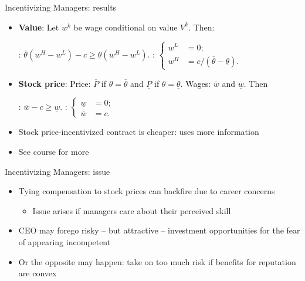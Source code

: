 \documentclass[english,10pt
,aspectratio=169
]{beamer}
\begin{document}
\begin{frame}{Incentivizing Managers: results}
	\begin{itemize}
		\item \textbf{Value}: Let $w^{k}$ be wage conditional on  value $V^{k}$. Then:
		\smallskip
		\begin{center}
			: $ \overline{\theta} (w^{H}-w^L) - c \geq \underline{\theta} (w^{H}-w^L)$. 
			\bigskip
			:
			$ \displaystyle
			\left\{
			\begin{aligned}
			w^{L} 	& = 0; \\
			w^{H}	& = c/(\overline{\theta}-\underline{\theta}).
			\end{aligned}
			\right.
			$
		\end{center}
		\smallskip
		\item \textbf{Stock price}: \textcolor{black}{Price}: $\overline{P}$ if $\theta=\overline{\theta}$ and $\underline{P}$ if $\theta=\underline{\theta}$. \textcolor{black}{Wages}: $\overline{w}$ and $\underline{w}$. Then
		\smallskip 
		\begin{center}
			: $\overline{w}-c \geq \underline{w}$. 
			\bigskip
			:
			$ \displaystyle
			\left\{
			\begin{aligned}
			\underline{w} 	& = 0; \\
			\overline{w}	& = c.
			\end{aligned}
			\right.
			$
		\end{center}
		\smallskip 
		\item Stock price-incentivized contract is cheaper: uses more information
		\item See  course for more
	\end{itemize}
\end{frame}


\begin{frame}{Incentivizing Managers: issue}
	\begin{itemize}
		\item Tying compensation to stock prices can backfire due to \alert{career concerns}
		\begin{itemize}
			\item Issue arises if managers care about their perceived skill
		\end{itemize}
		\item CEO may forego risky -- but attractive -- investment opportunities for the fear of appearing incompetent
		\item Or the opposite may happen: take on too much risk if benefits for reputation are convex
	\end{itemize}
\end{frame}
\end{document}
